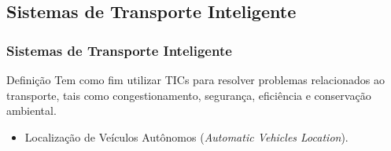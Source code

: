 \documentclass{beamer}
\begin{document}
\subsection{Sistemas de Transporte Inteligente}
\begin{frame}
\frametitle{Sistemas de Transporte Inteligente}
\begin{block}{Definição}
Tem como fim utilizar TICs para resolver problemas relacionados ao transporte, tais como congestionamento, segurança, eficiência e conservação ambiental. 
\end{block}
\begin{itemize}
\item Localização de Veículos Autônomos (\textit{Automatic Vehicles Location}).
\end{itemize}
\end{frame}
\end{document}
